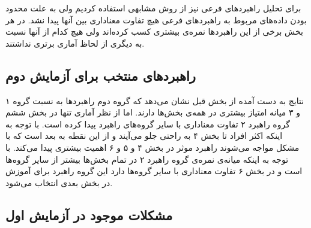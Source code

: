 \documentclass[twoside, a4paper,11pt]{book}
\numberwithin{equation}{chapter}
\numberwithin{table}{chapter}
\numberwithin{figure}{chapter}
\numberwithin{equation}{chapter}
\begin{document}
\begin{table}[]
\end{table}

برای تحلیل راهبردهای فرعی نیز از روش مشابهی استفاده کردیم ولی به علت محدود بودن داده‌های مربوط به راهبردهای فرعی هیچ تفاوت معناداری بین آنها پیدا نشد. در هر بخش برخی از این راهبردها نمره‌ی بیشتری کسب کرده‌اند ولی هیچ کدام از آنها نسبت به دیگری از لحاظ آماری برتری نداشتند.


\subsection{راهبردهای منتخب برای آزمایش دوم}

نتایج به دست آمده از بخش قبل نشان می‌دهد که گروه دوم راهبردها به نسبت گروه ۱ و ۳ میانه امتیاز بیشتری در همه‌ی بخش‌ها دارند. اما از نظر آماری تنها در بخش ششم گروه راهبرد ۲ تفاوت معناداری با سایر گروه‌های راهبرد پیدا کرده است. با توجه به اینکه اکثر افراد تا بخش ۴ به راحتی جلو می‌آیند و از این نقطه به بعد است که با مشکل مواجه می‌شوند راهبرد موثر در بخش ۴ و ۵ و ۶ اهمیت بیشتری پیدا می‌کند. با توجه به اینکه میانه‌ی نمره‌ی گروه راهبرد ۲ در تمام بخش‌ها بیشتر از سایر گروه‌ها است و در بخش ۶ تفاوت معناداری با سایر گروه‌ها دارد این گروه راهبرد برای آموزش در بخش بعدی انتخاب می‌شود.

\subsection{مشکلات موجود در آزمایش اول}
\end{document}
